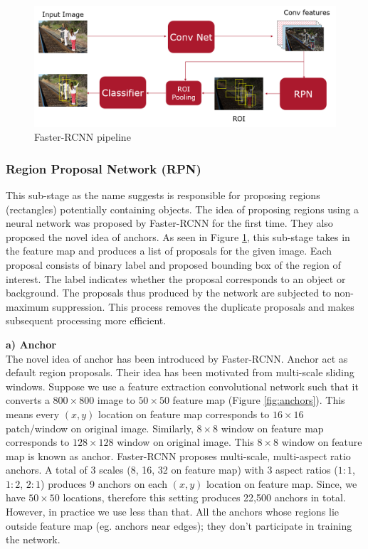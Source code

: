 \begin{figure}
    \centering
    \includegraphics[width=\linewidth]{images/faster-rcnn-pipeline.PNG}
    \caption[Faster-RCNN pipeline]{Faster-RCNN pipeline}
    \label{fig:faster-rcnn-pipeline}
\end{figure}

\subsubsection{Region Proposal Network (RPN)}
\label{sec:RPN}
This sub-stage as the name suggests is responsible for proposing regions (rectangles) potentially containing objects. The idea of proposing regions using a neural network was proposed by Faster-RCNN for the first time. They also proposed the novel idea of anchors. As seen in Figure \ref{fig:faster-rcnn-pipeline}, this sub-stage takes in the feature map and produces a list of proposals for the given image. Each proposal consists of binary label and proposed bounding box of the region of interest. The label indicates whether the proposal corresponds to an object or background. The proposals thus produced by the network are subjected to non-maximum suppression. This process removes the duplicate proposals and makes subsequent processing more efficient.  

\textbf{a) Anchor} \\
The novel idea of anchor has been introduced by Faster-RCNN. Anchor act as default region proposals. Their idea has been motivated from multi-scale sliding windows. Suppose we use a feature extraction convolutional network such that it converts a $800\times800$ image to $50\times50$ feature map (Figure \ref{fig:anchors}). This means every $(x,y)$ location on feature map corresponds to $16\times16$ patch/window on original image. Similarly, $8\times8$ window on feature map corresponds to $128\times128$ window on original image. This $8\times8$ window on feature map is known as anchor. Faster-RCNN proposes multi-scale, multi-aspect ratio anchors. A total of 3 scales (8, 16, 32 on feature map) with 3 aspect ratios ($1:1$, $1:2$, $2:1$) produces 9 anchors on each $(x,y)$ location on feature map. Since, we have $50\times50$ locations, therefore this setting produces 22,500 anchors in total. However, in practice we use less than that. All the anchors whose regions lie outside feature map (eg. anchors near edges); they don't participate in training the network. 

